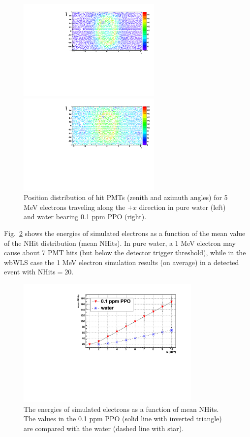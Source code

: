 \begin{figure}[htbp]
	\centering
	\begin{minipage}[t]{0.48\textwidth}
		\centering
		\includegraphics[width=7cm]{PMT_5MeVElectronWater.pdf}
	\end{minipage}
	\begin{minipage}[t]{0.48\textwidth}
		\centering
		\includegraphics[width=7cm]{PMT_5MeVElectron0p1ppmPPO.pdf}
	\end{minipage}
	\caption[Position distribution of hit PMTs (zenith and azimuth angles).]{Position distribution of hit PMTs (zenith and azimuth angles) for 5 MeV electrons traveling along the $+x$ direction in pure water (left) and water bearing 0.1 ppm PPO (right).\label{pmt_wls}}	
\end{figure}

Fig.~\ref{nhit_wls} shows the energies of simulated electrons as a function of the mean value of the $\mathrm{NHit}$ distribution (mean NHits). In pure water, a 1 MeV electron may cause about 7 PMT hits (but below the detector trigger threshold), while in the wbWLS case the 1 MeV electron simulation results (on average) in a detected event with NHits$=20$.

\begin{figure}[htbp]
	\centering	
	\includegraphics[width=9cm]{nhits_wls.pdf}
	\caption[The energies of simulated electrons as a function of mean NHits.]{The energies of simulated electrons as a function of mean NHits. The values in the 0.1 ppm PPO (solid line with inverted triangle) are compared with the water (dashed line with star).	\label{nhit_wls}}
\end{figure}

